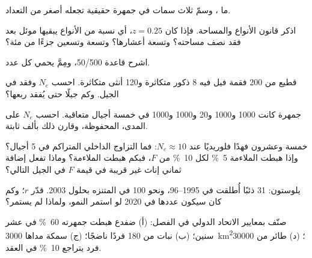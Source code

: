 \begin{exercise}[$\star$]\label{exo:b3:conservation-biology:2}
ما ، وسمّ ثلاث سمات في
جمهرة حقيقية تجعله أصغر من التعداد.
\end{exercise}

\begin{exercise}[$\star$]\label{exo:b3:conservation-biology:3}
اذكر قانون الأنواع والمساحة. فإذا كان $z = 0.25$، أي نسبة من الأنواع
يبقيها موئل بعد فقد نصف مساحته؟ وتسعة أعشارها؟ وتسعة وتسعين
جزءًا من مئة؟
\end{exercise}

\begin{exercise}[$\star$]\label{exo:b3:conservation-biology:4}
اشرح قاعدة 50/500، ومِمَّ يحمي كل عدد.
\end{exercise}

\begin{exercise}[$\star\star$]\label{exo:b3:conservation-biology:5}
قطيع من 200 فقمة فيل فيه 8 ذكور متكاثرة و120 أنثى
متكاثرة. احسب $N_{e}$ وفقد  في الجيل.
وكم جيلًا حتى يُفقد ربعها؟
\end{exercise}

\begin{exercise}[$\star\star$]\label{exo:b3:conservation-biology:6}
جمهرة كانت 1000 و1000 و20 و1000 و1000 في خمسة أجيال
متعاقبة. احسب $N_{e}$ على المدى، 
المحفوظة، وقارن ذلك بألف ثابتة.
\end{exercise}

\begin{exercise}[$\star\star$]\label{exo:b3:conservation-biology:7}
خمسة وعشرون فهدًا فلوريديًا عند $N_{e} \approx 10$: فما التزاوج
الداخلي المتراكم في 5 أجيال؟ وإذا هبطت الملاءمة \qty{5}{\%} لكل
\qty{10}{\%} من $F$، فبكم هبطت الملاءمة؟ وماذا تفعل إضافة
ثماني إناث غير قريبة في قيمة $F$ في الجيل التالي؟
\end{exercise}

\begin{exercise}[$\star\star$]\label{exo:b3:conservation-biology:8}
يلوستون: 31 ذئبًا أُطلقت في 1995--96، ونحو 100 في المتنزه بحلول
2003. قدّر $r$؛ وكم كان سيكون عددها في 2020 لو استمر النمو،
ولماذا لم يستمر؟
\end{exercise}

\begin{exercise}[$\star\star$]\label{exo:b3:conservation-biology:9}
صنّف بمعايير الاتحاد الدولي في الفصل: (أ) ضفدع هبطت
جمهرته \qty{60}{\%} في عشر سنين؛ (ب) نبات من 180 فردًا
ناضجًا؛ (ج) سمكة مداها \qty{3000}{km^2}؛ (د) طائر من
\num{30000} فرد يتراجع \qty{10}{\%} في العقد.
\end{exercise}

